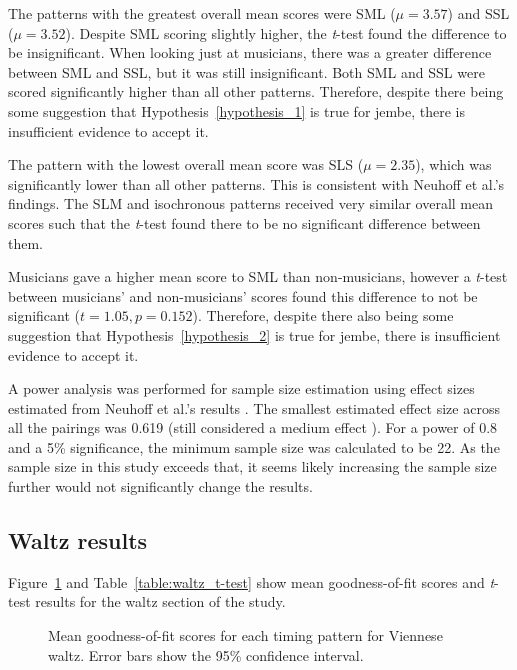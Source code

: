 \documentclass[12pt,twoside,openright]{report}
\begin{document}
The patterns with the greatest overall mean scores were SML ($\mu=3.57$) and SSL
($\mu=3.52$). Despite SML scoring slightly higher, the \textit{t}-test found the difference
to be insignificant. When looking just at musicians, there was a greater
difference between SML and SSL, but it was still insignificant. Both SML and SSL
were scored significantly higher than all other patterns. Therefore, despite
there being some suggestion that Hypothesis~\ref{hypothesis_1} is true for jembe, there is
insufficient evidence to accept it.

The pattern with the lowest overall mean score was SLS ($\mu=2.35$), which was
significantly lower than all other patterns. This is consistent with Neuhoff et
al.'s findings. The SLM and isochronous patterns received very similar overall
mean scores such that the \textit{t}-test found there to be no significant difference
between them.

Musicians gave a higher mean score to SML than non-musicians, however a \textit{t}-test
between musicians' and non-musicians' scores found this difference to not be
significant ($t=1.05, p=0.152$). Therefore, despite there also being some suggestion
that Hypothesis~\ref{hypothesis_2} is true for jembe, there is insufficient evidence to accept it.

A power analysis was performed for sample size estimation using effect sizes estimated from Neuhoff et al.'s results \cite{neuhoff2017}. The smallest estimated effect size across all the pairings was 0.619 (still considered a medium effect \cite{cohen2013}). For a power of 0.8 and a 5\% significance, the minimum sample size was calculated to be 22. As the sample size in this study exceeds that, it seems likely increasing the sample size further would not significantly change the results.


\subsection{Waltz results} \label{user_study_waltz_results}

Figure~\ref{fig:waltz_bar_charts} and Table~\ref{table:waltz_t-test} show mean goodness-of-fit scores and \textit{t}-test results for the
waltz section of the study.

\begin{figure}[ht]
    \centering
    \caption{Mean goodness-of-fit scores for each timing pattern for Viennese waltz. Error bars show the 95\% confidence interval.}
    \label{fig:waltz_bar_charts}
\end{figure}
\end{document}

